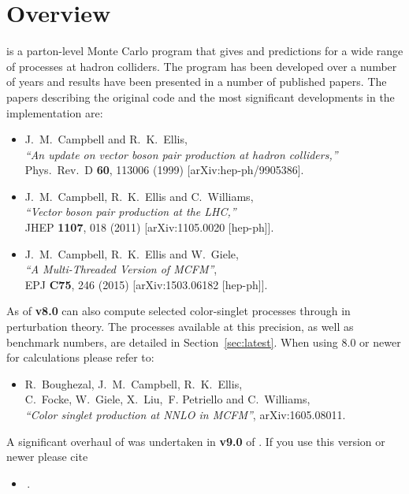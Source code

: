 \section{Overview}

\MCFM{} is a parton-level Monte Carlo program that gives \NLO{} and \NNLO{} predictions
for a wide range of processes at hadron colliders. The program has been
developed over a number of years and results have been presented in
a number of published papers.  The papers describing the original
code and the most significant developments in the \NLO{} implementation are:
\begin{itemize}
\item J.~M.~Campbell and R.~K.~Ellis, \\
  {\it ``An update on vector boson pair production at hadron colliders,''} \\
  Phys.\ Rev.\ D {\bf 60}, 113006 (1999)
  [arXiv:hep-ph/9905386].
\item J.~M.~Campbell, R.~K.~Ellis and C.~Williams, \\
  {\it ``Vector boson pair production at the LHC,''} \\
  JHEP {\bf 1107}, 018 (2011)
  [arXiv:1105.0020 [hep-ph]]. 
\item J.~M.~Campbell, R.~K.~Ellis and W.~Giele, \\
  {\it ``A Multi-Threaded Version of MCFM''}, \\
    EPJ {\bf C75}, 246 (2015)
    [arXiv:1503.06182 [hep-ph]].
\end{itemize}
 
As of \textbf{v8.0} \MCFM{} can also compute selected color-singlet processes through \NNLO{} in 
\QCD{}
perturbation theory.  The processes available at this precision, as well as
benchmark numbers, are detailed in Section~\ref{sec:latest}.  When using \MCFM{} 8.0 or newer
for \NNLO{} calculations please refer to:
\begin{itemize}
\item 
  R.~Boughezal, J.~M.~Campbell, R.~K.~Ellis, \\
   C.~Focke, W.~Giele, X.~Liu,~F. Petriello and  C.~Williams, \\
  {\it ``Color singlet production at NNLO in MCFM''},
  arXiv:1605.08011.
\end{itemize}

A significant overhaul of \MCFM{} was undertaken in \textbf{v9.0} of \MCFM{}. If you use
this version or newer please cite
\begin{itemize}
	\item {}\,.
\end{itemize}

